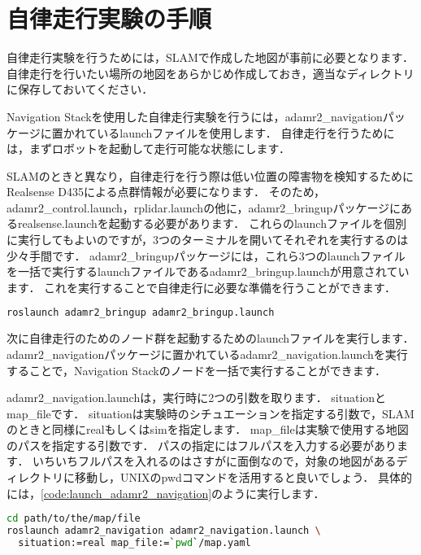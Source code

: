 \documentclass[{../../master}]{subfiles}
\begin{document}
\section{自律走行実験の手順}

自律走行実験を行うためには，SLAMで作成した地図が事前に必要となります．
自律走行を行いたい場所の地図をあらかじめ作成しておき，適当なディレクトリに保存しておいてください．

Navigation Stackを使用した自律走行実験を行うには，\textsf{adamr2\_navigation}パッケージに置かれているlaunchファイルを使用します．
自律走行を行うためには，まずロボットを起動して走行可能な状態にします．

SLAMのときと異なり，自律走行を行う際は低い位置の障害物を検知するためにRealsense D435による点群情報が必要になります．
そのため，\textsf{adamr2\_control.launch}，\textsf{rplidar.launch}の他に，\textsf{adamr2\_bringup}パッケージにある\textsf{realsense.launch}を起動する必要があります．
これらのlaunchファイルを個別に実行してもよいのですが，3つのターミナルを開いてそれぞれを実行するのは少々手間です．
\textsf{adamr2\_bringup}パッケージには，これら3つのlaunchファイルを一括で実行するlaunchファイルである\textsf{adamr2\_bringup.launch}が用意されています．
これを実行することで自律走行に必要な準備を行うことができます．

\begin{lstlisting}[language=sh, label=code:launch_adamr2_bringup, caption=Launch \textsf{adamr2\_bringup.launch}]
roslaunch adamr2_bringup adamr2_bringup.launch
\end{lstlisting}

次に自律走行のためのノード群を起動するためのlaunchファイルを実行します．
\textsf{adamr2\_navigation}パッケージに置かれている\textsf{adamr2\_navigation.launch}を実行することで，Navigation Stackのノードを一括で実行することができます．

\textsf{adamr2\_navigation.launch}は，実行時に2つの引数を取ります．
\textsf{situation}と\textsf{map\_file}です．
\textsf{situation}は実験時のシチュエーションを指定する引数で，SLAMのときと同様に\textsf{real}もしくは\textsf{sim}を指定します．
\textsf{map\_file}は実験で使用する地図のパスを指定する引数です．
パスの指定にはフルパスを入力する必要があります．
いちいちフルパスを入れるのはさすがに面倒なので，対象の地図があるディレクトリに移動し，UNIXの\textsf{pwd}コマンドを活用すると良いでしょう．
具体的には，\ref{code:launch_adamr2_navigation}のように実行します．

\begin{lstlisting}[language=sh, label=code:launch_adamr2_navigation, caption=Launch \textsf{adamr2\_navigation.launch}]
cd path/to/the/map/file
roslaunch adamr2_navigation adamr2_navigation.launch \
  situation:=real map_file:=`pwd`/map.yaml
\end{lstlisting}
\end{document}
